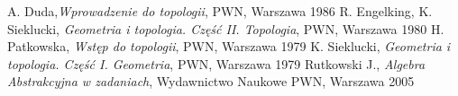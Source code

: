 \begin{thebibliography}{3}                      %
\small              %
A. Duda,\emph{Wprowadzenie do topologii}, PWN, Warszawa 1986
R. Engelking, K. Sieklucki, \emph{Geometria i topologia. Część II. Topologia}, PWN, Warszawa 1980
H. Patkowska, \emph{Wstęp do topologii}, PWN, Warszawa 1979
K. Sieklucki, \emph{Geometria i topologia. Część I. Geometria}, PWN, Warszawa 1979
Rutkowski J., \emph{Algebra Abstrakcyjna w zadaniach},  Wydawnictwo Naukowe PWN, Warszawa 2005
\end{thebibliography}                           %